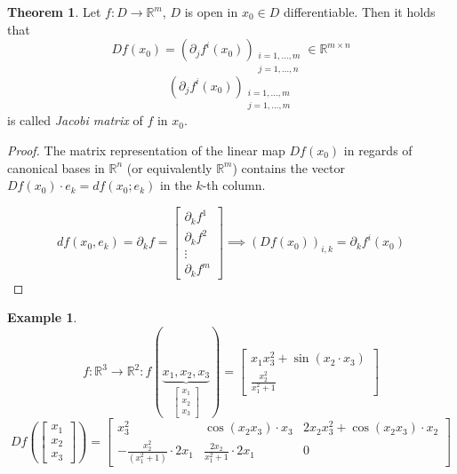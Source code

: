 \documentclass[a4paper,landscape,twocolumn]{article}
\theoremstyle{definition}
\newtheorem{theorem}{Theorem}
\newtheorem{ex}{Example}
\begin{document}
\begin{theorem}
  Let $f: D \to \mathbb R^m$, $D$ is open in $x_0 \in D$ differentiable.
  Then it holds that
  \[ Df(x_0) = \left(\partial_j f^i(x_0)\right)_{\substack{i = 1,\ldots,m \\ j = 1,\ldots,n}} \in \mathbb R^{m\times n} \]
  \[ \left(\partial_j f^i(x_0)\right)_{\substack{i=1,\ldots,m \\ j = 1,\ldots,m}} \]
  is called \emph{Jacobi matrix} of $f$ in $x_0$.
\end{theorem}

\begin{proof}
  The matrix representation of the linear map $Df(x_0)$ in regards of canonical bases
  in $\mathbb R^n$ (or equivalently $\mathbb R^m$) contains the vector
  $Df(x_0) \cdot e_k = df(x_0; e_k)$ in the $k$-th column.

  \[
    df(x_0, e_k) = \partial_k f = \begin{bmatrix} \partial_k f^1 \\ \partial_k f^2 \\ \vdots \\ \partial_k f^m \end{bmatrix}
    \implies (Df(x_0))_{i,k} = \partial_k f^i(x_0)
  \]
\end{proof}

\begin{ex}
  \[
    f: \mathbb R^3 \to \mathbb R^2: f(\underbrace{x_1, x_2, x_3}_{\begin{bmatrix} x_1 \\ x_2 \\ x_3 \end{bmatrix}}) =
    \begin{bmatrix}
      x_1 x_3^2 + \sin(x_2 \cdot x_3) \\
      \frac{x_2^2}{x_1^2 + 1}
    \end{bmatrix}
  \] \[
  Df\left(\begin{bmatrix} x_1 \\ x_2 \\ x_3 \end{bmatrix}\right) =
  \begin{bmatrix}
    x_3^2                                   & \cos(x_2 x_3) \cdot x_3                & 2x_2 x_3^2 + \cos(x_2 x_3) \cdot x_2 \\
    - \frac{x_2^2}{(x_1^2 + 1)} \cdot 2x_1   & \frac{2x_2}{x_1^2 + 1} \cdot 2x_1      & 0
  \end{bmatrix}
  \]
\end{ex}
\end{document}
